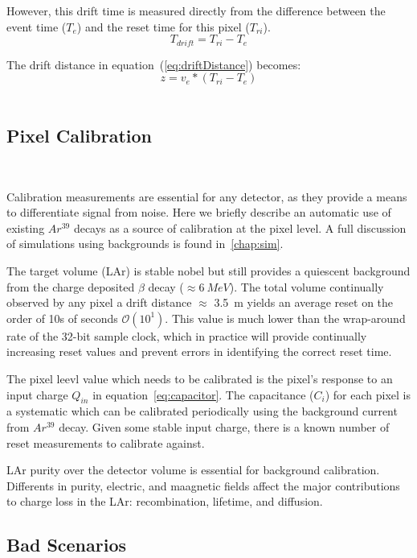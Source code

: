 However, this drift time is measured directly from the difference between the event time ($T_{e}$) and the reset time for this pixel ($T_{ri}$).
\begin{equation}
  T_{drift} = T_{ri} - T_{e}
\end{equation}

The drift distance in equation~(\ref{eq:driftDistance}) becomes:
\begin{equation}
  z = v_{e} * (T_{ri} - T_{e})
\end{equation}~\label{eq:driftDistanceCalc}

\subsection{Pixel Calibration}
~\label{sec:qpix_calib}

Calibration measurements are essential for any detector, as they provide a means to differentiate signal from noise.
Here we briefly describe an automatic use of existing $Ar^{39}$ decays as a source of calibration at the pixel level.
A full discussion of simulations using backgrounds is found in~\ref{chap:sim}.

The target volume (LAr) is stable nobel but still provides a quiescent background from the charge deposited $\beta$ decay ($\approx 6~\unit{MeV}$).
The total volume continually observed by any pixel a drift distance $\approx$ 3.5~\unit{m} yields an average reset on the order of 10s of seconds $\mathcal{O}(10^{1})$.
This value is much lower than the wrap-around rate of the 32-bit sample clock, which in practice will provide continually increasing reset values and prevent errors in identifying the correct reset time.

The pixel leevl value which needs to be calibrated is the pixel's response to an input charge $Q_{in}$ in equation~\ref{eq:capacitor}.
The capacitance ($C_{i}$) for each pixel is a systematic which can be calibrated periodically using the background current from $Ar^{39}$ decay.
Given some stable input charge, there is a known number of reset measurements to calibrate against.

LAr purity over the detector volume is essential for background calibration.
Differents in purity, electric, and maagnetic fields affect the major contributions to charge loss in the LAr: recombination, lifetime, and diffusion.

\subsection{Bad Scenarios}

